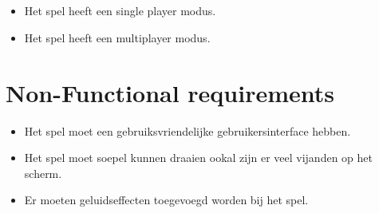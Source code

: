 \subsection{}
\begin{itemize}
    \item Het spel heeft een single player modus.
    \item Het spel heeft een multiplayer modus.
\end{itemize}

\section{Non-Functional requirements}
\begin{itemize}
    \item Het spel moet een gebruiksvriendelijke gebruikersinterface hebben. 
    \item Het spel moet soepel kunnen draaien ookal zijn er veel vijanden op het scherm. 
    \item Er moeten geluidseffecten toegevoegd worden bij het spel.
\end{itemize}
